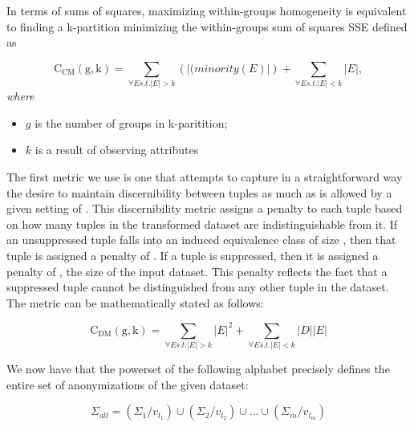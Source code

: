\documentclass[]{seismica}
\begin{document}
    In terms of sums of squares, maximizing within-groups homogeneity is equivalent to finding a k-partition minimizing the within-groups sum of squares SSE defined as

    \begin{equation}
        \mathrm{C_{CM}(g,k)} = \sum_{\forall E s.t. \left | E \right | > k}
        (\left | (minority(E) \right |) + \sum_{\forall E s.t. \left | E \right | < k}
        \left | E \right |,
    \end{equation}
    \emph{where}
        \begin{itemize}
            \item $g$ is the number of groups in k-paritition;
            \item $k$ is a result of observing attributes
        \end{itemize}

The first metric we use is one that attempts to capture in a straightforward way the desire to maintain discernibility between tuples as much as is allowed by a given setting of . This discernibility metric assigns a penalty to each tuple based on how many tuples in the transformed dataset are indistinguishable from it. If an unsuppressed tuple falls into an induced equivalence class of size , then that tuple is assigned a penalty of . If a tuple is suppressed, then it is assigned a penalty of , the size of the input dataset. This penalty reflects the fact that a suppressed tuple cannot be distinguished from any other tuple in the dataset. The metric can be mathematically stated as follows:

    \begin{equation}
        \mathrm{C_{DM}(g,k)} = \sum_{\forall E s.t. \left | E \right | > k}
        \left | E \right |^2 + \sum_{\forall E s.t. \left | E \right | < k}
        \left |D \right | \left | E \right |
    \end{equation}

    We now have that the powerset of the following alphabet precisely defines the entire set of anonymizations of the given dataset:

    \begin{equation}
        \Sigma_{all} = (\Sigma_1 / v_{l_1})
        \cup (\Sigma_2/ v_{l_2})
        \cup ...
        \cup (\Sigma_m / v_{l_m})
    \end{equation}
\end{document}
